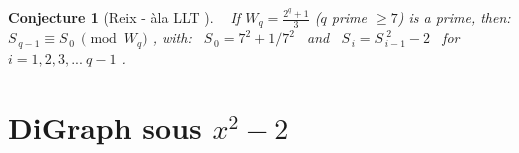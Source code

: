 \documentclass[latin1]{quadrature}
\newcommand{\PMod}[1]{\!\!\pmod{#1}}
\newcommand{\LLegendre}[2]{\big(\leavevmode\kern.05em \raise.5ex\hbox{#1}\kern-.2em
/\kern-.15em\lower.55ex\hbox{{#2}}\big)}
\newtheorem{theorem}{Theorem}
\newtheorem{conjecture}{Conjecture}
\newif\ifenfrancais
\begin{document}
\begin{article}
\begin{article}
\ifenfrancais
\begin{conjecture}[Reix - \`ala LLT - Cycle du DiGraph]
\ 
\newline
Si $W_q = \frac{ 2^{\scriptstyle q} + 1}{3}$ ($q$ premier $\geqslant 7$) est premier, alors :
$S_{\,q-1} \equiv S_{\,0} \ \PMod{W_q}$ ,
avec : \ $S_{\,0} = 7^2+1/7^2$ \ et \ $S_{\,i} = S_{\,i-1}^{\,\,2} - 2$ \ pour \ $i=1,2,3, ... \ q-1$ .
\end{conjecture}
\else
\begin{conjecture}[Reix - \`ala LLT ]
\ 
\newline
If $W_q = \frac{ 2^{\scriptstyle q} + 1}{3}$ ($q$ prime $\geqslant 7$) is a prime, then:
$S_{\,q-1} \equiv S_{\,0} \ \PMod{W_q}$ ,
with: \ $S_{\,0} = 7^2+1/7^2$ \ and \ $S_{\,i} = S_{\,i-1}^{\,\,2} - 2$ \ for \ $i=1,2,3, ... \ q-1$ .
\end{conjecture}
\fi




\vspace{-.2in}



\ifenfrancais
\section{ DiGraph sous $x^2-2$ }
\else

\end{article}
\end{article}
\end{document}
